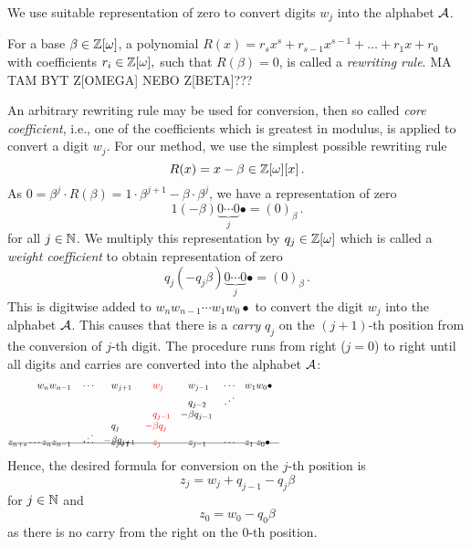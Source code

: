  We use suitable representation of zero to convert digits $w_j$ into the alphabet $\mathcal{A}$. 
  \begin{defn}
  For a base $\beta \in \mathbb{Z}[\omega]$, a polynomial $R(x)=r_s x^s+r_{s-1}x^{s-1}+ \dots + r_1 x+r_0$ with coefficients $r_i \in \mathbb{Z}[\omega],$ such that $R(\beta)=0$, is called a \emph{rewriting rule}. MA TAM BYT Z[OMEGA] NEBO Z[BETA]???
  \end{defn}  
  
  An arbitrary rewriting rule may be used for conversion, then so called \emph{core coefficient}, i.e., one of the coefficients which is greatest in modulus, is applied to convert a digit $w_j$. For our method, we use the simplest possible rewriting rule
  $$
    R(x)=x-\beta \in \mathbb{Z}[\omega][x]\,.
  $$
As $0=\beta^{j} \cdot R(\beta)=1\cdot \beta^{j+1} -\beta \cdot \beta^{j}$, we have a representation of zero 
$$1 (-\!\beta) \underbrace{0 \cdots 0}_{j}\bullet = (0)_\beta\,. $$
for all $j \in \mathbb{N}$. We multiply this representation by $q_j \in \mathbb{Z}[\omega]$ which is called a \emph{weight coefficient} to obtain representation of zero 
$$q_j (-q_j\beta) \underbrace{0 \cdots 0}_{j}\bullet = (0)_\beta\,. $$ 
This is digitwise added to $w_{n} w_{n-1}\cdots w_1 w_0 \bullet$ to convert the digit $w_j$ into the alphabet $\mathcal{A}$. This causes that there is a \emph{carry} $q_{j}$ on the $(j+1)$-th position from the conversion of $j$-th digit. The procedure runs from right ($j=0$) to right until all digits and carries are converted into the alphabet $\mathcal{A}$:
    \begin{align*}
        w_n w_{n-1}&&&\cdots& &w_{j+1}&\!\! &\textcolor{red}{w_j}  & \!\!  &w_{j-1} &&\cdots &&w_1 w_0\bullet \hspace{200pt}\\[-5pt]
                   &&&&       &       & &     &   &q_{j-2} &&\iddots\\[-3pt] 
                   &&&&       &       & &\textcolor{red}{q_{j-1}}& -&\beta q_{j-1} \\[-3pt]
                   &&&&         &q_j&   \textcolor{red}{-}&\textcolor{red}{\beta q_j} &&\\[-8pt]
                   &&&  \iddots      &   -&\beta q_{j+1}&   &\ &&\\[-17pt]
    \intertext{\line(1,0){280}}
    \vspace{-15pt}
    \\[-30pt]
     z_{n+s} \cdots z_{n} z_{n-1}&&&\cdots& &z_{j+1}& &\textcolor{red}{z_j}& &z_{j-1} &&\cdots &&z_1 \; z_0\bullet                            
    \end{align*}
    Hence, the desired formula for conversion on the $j$-th position is 
    \begin{equation}
        z_j=w_j + q_{j-1} - q_j \beta
    \end{equation}
    for $j \in \mathbb{N}$ and 
    $$
        z_0=w_0 -q_0 \beta
    $$ 
    as there is no carry from the right on the 0-th position.
    
